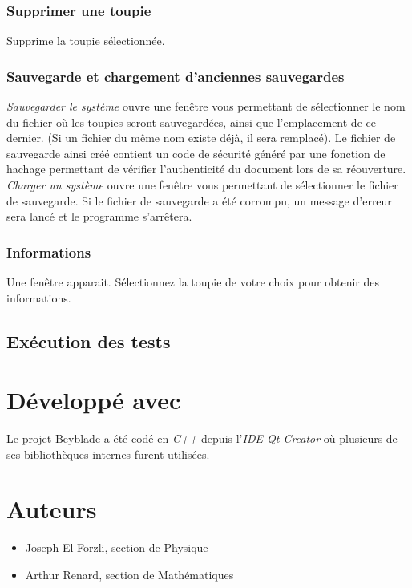 \documentclass[a4paper]{article}%
\begin{document}
		\subsubsection {Supprimer une toupie}
			Supprime la toupie sélectionnée.
		\subsubsection {Sauvegarde et chargement d'anciennes sauvegardes}
			\emph {Sauvegarder le système} ouvre une fenêtre vous permettant de sélectionner le nom du fichier où les toupies seront sauvegardées, ainsi que l'emplacement de ce dernier. (Si un fichier du même nom existe déjà, il sera remplacé). 
			Le fichier de sauvegarde ainsi créé contient un code de sécurité généré par une fonction de hachage permettant de vérifier l'authenticité du document lors de sa réouverture. \\
			
			\emph {Charger un système} ouvre une fenêtre vous permettant de sélectionner le fichier de sauvegarde. Si le fichier de sauvegarde a été corrompu, un message d'erreur sera lancé et le programme s'arrêtera.
		\subsubsection {Informations}
			Une fenêtre apparait. Sélectionnez la toupie de votre choix pour obtenir des informations.
	\subsection {Exécution des tests}
\section{Développé avec}
	Le projet Beyblade a été codé en \emph{C++}  depuis l'\emph{IDE Qt Creator} où plusieurs de ses bibliothèques internes furent utilisées.
	
\section {Auteurs}
	\begin{itemize}
		\item Joseph El-Forzli, section de Physique
		\item Arthur Renard, section de Mathématiques
	\end{itemize}
\end{document}
